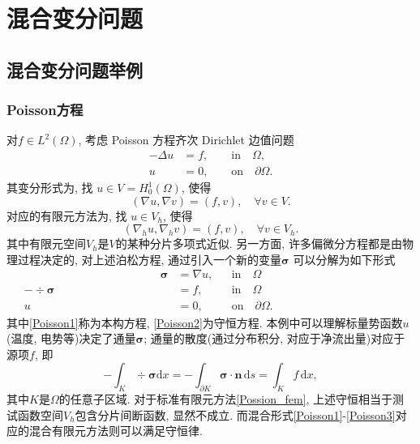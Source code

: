 \chapter{混合变分问题}





\section{混合变分问题举例}
\subsection*{Poisson方程}
对$ f \in L^2(\Omega)$, 考虑 Poisson 方程齐次 Dirichlet 边值问题
\begin{equation}
\begin{aligned}
-\Delta u & = f,   \qquad \text{in} \quad \Omega , \nonumber \\
u & = 0,           \qquad \text{on} \quad \partial \Omega. \nonumber
\end{aligned}
\end{equation}
其变分形式为, 找 $u \in V = H_0^1(\Omega) $, 使得
\begin{equation}\label{Possion}
( \nabla u, \nabla v ) = ( f, v ), \quad \forall v \in V. 
\end{equation}
对应的有限元方法为, 找 $ u \in V_h $, 使得
\begin{equation}\label{Possion_fem}
( \nabla_h u, \nabla_h v ) = ( f, v ), \quad \forall v \in V_h.  
\end{equation}
其中有限元空间$V_h$是$V$的某种分片多项式近似. 另一方面, 许多偏微分方程都是由物理过程决定的, 对上述泊松方程, 通过引入一个新的变量$\boldsymbol{\sigma}$ 可以分解为如下形式
\begin{subequations}
\begin{align}
\qquad \qquad \qquad \qquad \qquad \qquad
\boldsymbol\sigma &= \nabla u, &&\text{in} \quad\Omega \qquad \qquad \qquad \qquad \qquad \qquad \label{Poisson1}\\
-\div\boldsymbol\sigma &= f , &&\text{in} \quad\Omega \label{Poisson2}\\
u & = 0,               &&  \text{on} \quad \partial \Omega. \label{Poisson3}
\end{align}
\end{subequations}
其中\eqref{Poisson1}称为本构方程, \eqref{Poisson2}为守恒方程. 本例中可以理解标量势函数$u$(温度, 电势等)决定了通量$\boldsymbol{\sigma}$; 通量的散度(通过分布积分, 对应于净流出量)对应于源项$f$, 即
\[
-\int_K \div \boldsymbol \sigma \text{d}x = -\int_{\partial K}\boldsymbol \sigma\cdot\boldsymbol{n}\,\text{d}s=\int_{K}f\,\text{d}x,
\]
其中$K$是$\Omega$的任意子区域. 对于标准有限元方法\eqref{Possion_fem}, 上述守恒相当于测试函数空间$V_h$包含分片间断函数, 显然不成立. 而混合形式\eqref{Poisson1}-\eqref{Poisson3}对应的混合有限元方法则可以满足守恒律.

